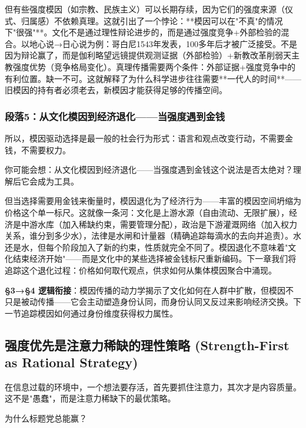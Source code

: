 \documentclass[openany, a4paper, 12pt]{book}
\newenvironment{motivation}{
	\vspace{0.5em}
	\begin{tcolorbox}[
		colback=gray!10,           %
		colframe=gray!60,          %
		title=\textit{本章动机 (Motivation)},
		fonttitle=\bfseries,
		arc=0mm,                   %
		leftrule=3mm               %
		]
		\small \itshape %
	}{
	\end{tcolorbox}
	\vspace{1em}
}
\begin{document}
\begin{motivation}
\begin{motivation}
\begin{motivation}
但有些强度模因（如宗教、民族主义）可以长期存续，因为它们的强度来源（仪式、归属感）不依赖真理。这就引出了一个悖论：**模因可以在"不真"的情况下"很强"**。文化不是通过理性辩论进步的，而是通过强度竞争+外部检验的混合。以地心说→日心说为例：哥白尼1543年发表，100多年后才被广泛接受。不是因为辩论赢了，而是伽利略望远镜提供观测证据（外部检验）+新教改革削弱天主教强度优势（竞争格局变化）。真理传播需要两个条件：外部证据+强度竞争中的有利位置。缺一不可。这就解释了为什么科学进步往往需要**一代人的时间**——旧模因的持有者必须老去，新模因才能获得足够的传播空间。

	\subsubsection*{段落5：从文化模因到经济退化——当强度遇到金钱}
	所以，模因驱动选择是最一般的社会行为形式：语言和观点改变行动，不需要金钱，不需要权力。
	\begin{tcolorbox}[colback=yellow!5, title=\textit{读者行为预测}]
		你可能会想：从文化模因到经济退化——当强度遇到金钱这个说法是否太绝对？理解后它会成为工具。
	\end{tcolorbox}

但当选择需要用金钱来衡量时，模因退化为了经济行为——丰富的模因空间坍缩为价格这个单一标尺。这就像一条河：文化是上游水源（自由流动、无限扩展），经济是中游水库（加入稀缺约束，需要管理分配），政治是下游灌溉网络（加入权力关系，谁分到多少水），法律是水闸和计量器（精确追踪每滴水的去向并追责）。水还是水，但每个阶段加入了新的约束，性质就完全不同了。模因退化不意味着"文化结束经济开始"——而是文化中的某些选择被金钱标尺重新编码。下一章我们将追踪这个退化过程：价格如何取代观点，供求如何从集体模因聚合中涌现。

	\textbf{§3→§4 逻辑衔接}：模因传播的动力学揭示了文化如何在人群中扩散，但模因不只是被动传播——它会主动塑造身份认同，而身份认同又反过来影响经济交换。下一节追踪模因如何通过身份维度获得权力属性。


	
	\subsection{强度优先是注意力稀缺的理性策略 (Strength-First as Rational Strategy)}
	\begin{motivation}
		在信息过载的环境中，一个想法要存活，首先要抓住注意力，其次才是内容质量。这不是"愚蠢"，而是注意力稀缺下的最优策略。
	\end{motivation}
	\begin{questionbox}
		为什么标题党总能赢？
	\end{questionbox}


\end{motivation}
\end{motivation}
\end{motivation}
\end{document}

